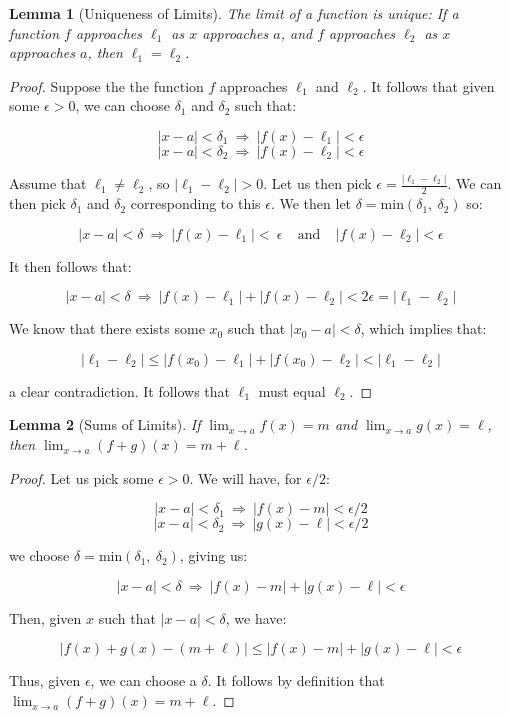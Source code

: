 \documentclass[10pt, oneside]{article}
\newtheorem{lem}{Lemma}
\begin{document}
    \begin{lem}[Uniqueness of Limits]
      The limit of a function is unique: If a function $f$ approaches $\ell_1$ as $x$ approaches $a$, and $f$ approaches $\ell_2$ as
      $x$ approaches $a$, then $\ell_1 = \ell_2$.
    \end{lem}

    \begin{proof}
      Suppose the the function $f$ approaches $\ell_1$ and $\ell_2$. It follows that given some $\epsilon > 0$, we can choose $\delta_1$ and $\delta_2$ such that:

      $$|x - a| < \delta_1 \ \Rightarrow \ |f(x) - \ell_1| < \epsilon$$
      $$|x - a| < \delta_2 \ \Rightarrow \ |f(x) - \ell_2| < \epsilon$$

      Assume that $\ell_1 \neq \ell_2$, so $|\ell_1 - \ell_2| > 0$. Let us then pick $\epsilon = \frac{|\ell_1 - \ell_2|}{2}$. We can then pick $\delta_1$ and $\delta_2$ corresponding
      to this $\epsilon$. We then let $\delta = \text{min}(\delta_1, \ \delta_2)$ so:

      $$|x - a| < \delta \ \Rightarrow \ |f(x) - \ell_1| < \ \epsilon \ \ \ \ \ \text{and} \ \ \ \ \ |f(x) - \ell_2| < \epsilon$$

      It then follows that:

      $$|x - a| < \delta \ \Rightarrow \ |f(x) - \ell_1| + |f(x) - \ell_2| < 2\epsilon = |\ell_1 - \ell_2|$$

      We know that there exists some $x_0$ such that $|x_0 - a| < \delta$, which implies that:

      $$|\ell_1 - \ell_2| \leq |f(x_0) - \ell_1| + |f(x_0) - \ell_2| < |\ell_1 - \ell_2|$$

      a clear contradiction. It follows that $\ell_1$ must equal $\ell_2$.

    \end{proof}

    \begin{lem}[Sums of Limits]
      If $\lim_{x \to a} f(x) = m$ and $\lim_{x \to a} g(x) = \ell$, then $\lim_{x \to a} (f + g)(x) = m + \ell$.
    \end{lem}

    \begin{proof}

      Let us pick some $\epsilon > 0$. We will have, for $\epsilon/2$:

      $$|x - a| < \delta_1 \ \Rightarrow \ |f(x) - m| < \epsilon/2$$
      $$|x - a| < \delta_2 \ \Rightarrow \ |g(x) - \ell| < \epsilon/2$$

      we choose $\delta = \text{min}(\delta_1, \ \delta_2)$, giving us:

      $$|x - a| < \delta \ \Rightarrow \ |f(x) - m| + |g(x) - \ell| < \epsilon$$

      Then, given $x$ such that $|x - a| < \delta$, we have:

      $$|f(x) + g(x) - (m + \ell)| \leq |f(x) - m| + |g(x) - \ell| < \epsilon$$

      Thus, given $\epsilon$, we can choose a $\delta$. It follows by definition that $\lim_{x \to a} (f + g)(x) = m + \ell$.

    \end{proof}
\end{document}

